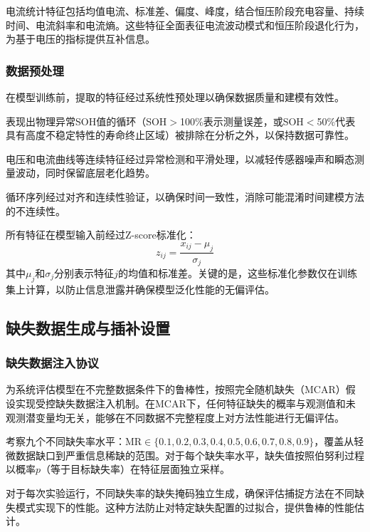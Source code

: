 \documentclass[10pt,a4paper]{ctexart}
\begin{document}
电流统计特征包括均值电流、标准差、偏度、峰度，结合恒压阶段充电容量、持续时间、电流斜率和电流熵。这些特征全面表征电流波动模式和恒压阶段退化行为，为基于电压的指标提供互补信息。

\subsubsection{数据预处理}

在模型训练前，提取的特征经过系统性预处理以确保数据质量和建模有效性。

表现出物理异常SOH值的循环（SOH$>$100\%表示测量误差，或SOH$<$50\%代表具有高度不稳定特性的寿命终止区域）被排除在分析之外，以保持数据可靠性。

电压和电流曲线等连续特征经过异常检测和平滑处理，以减轻传感器噪声和瞬态测量波动，同时保留底层老化趋势。

循环序列经过对齐和连续性验证，以确保时间一致性，消除可能混淆时间建模方法的不连续性。

所有特征在模型输入前经过Z-score标准化：
\begin{equation}
    z_{ij} = \frac{x_{ij} - \mu_j}{\sigma_j}
\end{equation}
其中$\mu_j$和$\sigma_j$分别表示特征$j$的均值和标准差。关键的是，这些标准化参数仅在训练集上计算，以防止信息泄露并确保模型泛化性能的无偏评估。

\subsection{缺失数据生成与插补设置}\label{sec:missing}

\subsubsection{缺失数据注入协议}

为系统评估模型在不完整数据条件下的鲁棒性，按照完全随机缺失（MCAR）假设实现受控缺失数据注入机制。在MCAR下，任何特征缺失的概率与观测值和未观测潜变量均无关，能够在不同数据不完整程度上对方法性能进行无偏评估。

考察九个不同缺失率水平：MR$\in\{0.1, 0.2, 0.3, 0.4, 0.5, 0.6, 0.7, 0.8, 0.9\}$，覆盖从轻微数据缺口到严重信息稀缺的范围。对于每个缺失率水平，缺失值按照伯努利过程以概率$p$（等于目标缺失率）在特征层面独立采样。

对于每次实验运行，不同缺失率的缺失掩码独立生成，确保评估捕捉方法在不同缺失模式实现下的性能。这种方法防止对特定缺失配置的过拟合，提供鲁棒的性能估计。
\end{document}
